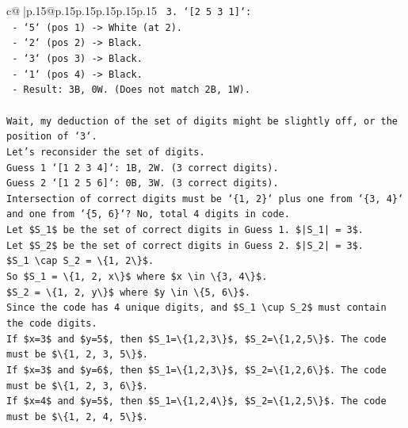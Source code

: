 \documentclass{article}
\begin{document}
{\begin{supertabular}{c@{$\;$}|p{.15\linewidth}@{}p{.15\linewidth}p{.15\linewidth}p{.15\linewidth}p{.15\linewidth}p{.15\linewidth}}
{{{\texttt{    3. `{[}2 5 3 1{]}`:} \\
\texttt{       {-} `5` (pos 1) {-}> White (at 2).} \\
\texttt{       {-} `2` (pos 2) {-}> Black.} \\
\texttt{       {-} `3` (pos 3) {-}> Black.} \\
\texttt{       {-} `1` (pos 4) {-}> Black.} \\
\texttt{       {-} Result: 3B, 0W. (Does not match 2B, 1W).} \\
\\ 
\texttt{Wait, my deduction of the set of digits might be slightly off, or the position of `3`.} \\
\texttt{Let's reconsider the set of digits.} \\
\texttt{Guess 1 `{[}1 2 3 4{]}`: 1B, 2W. (3 correct digits).} \\
\texttt{Guess 2 `{[}1 2 5 6{]}`: 0B, 3W. (3 correct digits).} \\
\texttt{Intersection of correct digits must be `\{1, 2\}` plus one from `\{3, 4\}` and one from `\{5, 6\}`? No, total 4 digits in code.} \\
\texttt{Let \$S\_1\$ be the set of correct digits in Guess 1. \$|S\_1| = 3\$.} \\
\texttt{Let \$S\_2\$ be the set of correct digits in Guess 2. \$|S\_2| = 3\$.} \\
\texttt{\$S\_1 \textbackslash{}cap S\_2 = \textbackslash{}\{1, 2\textbackslash{}\}\$.} \\
\texttt{So \$S\_1 = \textbackslash{}\{1, 2, x\textbackslash{}\}\$ where \$x \textbackslash{}in \textbackslash{}\{3, 4\textbackslash{}\}\$.} \\
\texttt{\$S\_2 = \textbackslash{}\{1, 2, y\textbackslash{}\}\$ where \$y \textbackslash{}in \textbackslash{}\{5, 6\textbackslash{}\}\$.} \\
\texttt{Since the code has 4 unique digits, and \$S\_1 \textbackslash{}cup S\_2\$ must contain the code digits.} \\
\texttt{If \$x=3\$ and \$y=5\$, then \$S\_1=\textbackslash{}\{1,2,3\textbackslash{}\}\$, \$S\_2=\textbackslash{}\{1,2,5\textbackslash{}\}\$. The code must be \$\textbackslash{}\{1, 2, 3, 5\textbackslash{}\}\$.} \\
\texttt{If \$x=3\$ and \$y=6\$, then \$S\_1=\textbackslash{}\{1,2,3\textbackslash{}\}\$, \$S\_2=\textbackslash{}\{1,2,6\textbackslash{}\}\$. The code must be \$\textbackslash{}\{1, 2, 3, 6\textbackslash{}\}\$.} \\
\texttt{If \$x=4\$ and \$y=5\$, then \$S\_1=\textbackslash{}\{1,2,4\textbackslash{}\}\$, \$S\_2=\textbackslash{}\{1,2,5\textbackslash{}\}\$. The code must be \$\textbackslash{}\{1, 2, 4, 5\textbackslash{}\}\$.} \\
}}}
\end{supertabular}}
\end{document}
